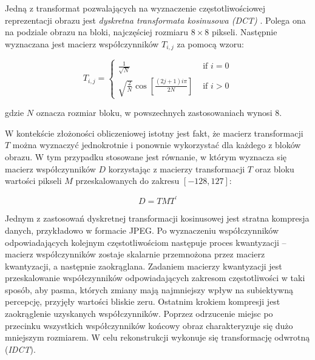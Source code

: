 {{{            %
            Jedną z transformat pozwalających na wyznaczenie częstotliwościowej reprezentacji obrazu jest
            \textit{dyskretna transformata kosinusowa \textnormal{(}DCT\textnormal{)}} \cite{ImageCompressionDCT}.
            Polega ona na podziale obrazu na bloki, najczęściej rozmiaru $8 \times 8$ pikseli. Następnie wyznaczana jest
            macierz współczynników $T_{i, j}$ za pomocą wzoru:

            \begin{equation}\label{eqt:dctcoef}
                T_{i, j}=\left\{\begin{array}{ll}\frac{1}{\sqrt{N}} & \text { if } i=0 \\ \sqrt{\frac{2}{N}} \cos \left[\frac{(2 j+1) i \pi}{2 N}\right] & \text { if } i>0\end{array}\right.
            \end{equation}

            gdzie $N$ oznacza rozmiar bloku, w powszechnych zastosowaniach wynosi 8.

            W kontekście złożoności obliczeniowej istotny jest fakt, że macierz transformacji $T$ można wyznaczyć
            jednokrotnie i ponownie wykorzystać dla każdego z bloków obrazu. W tym przypadku stosowane jest równanie, w
            którym wyznacza się macierz współczynników $D$ korzystając z macierzy transformacji $T$ oraz bloku wartości
            pikseli $M$ przeskalowanych do zakresu $[-128, 127]$:

            \begin{equation}\label{eqt:dctmat}
                D=T M T^{\prime}
            \end{equation}

            Jednym z zastosowań dyskretnej transformacji kosinusowej jest stratna kompresja danych, przykładowo w
            formacie JPEG. Po wyznaczeniu współczynników odpowiadających kolejnym częstotliwościom następuje proces
            kwantyzacji -- macierz współczynników zostaje skalarnie przemnożona przez macierz kwantyzacji, a następnie
            zaokrąglana. Zadaniem macierzy kwantyzacji jest przeskalowanie współczynników odpowiadających zakresom
            częstotliwości w taki sposób, aby pasma, których zmiany mają najmniejszy wpływ na subiektywną percepcję,
            przyjęły wartości bliskie zeru. Ostatnim krokiem kompresji jest zaokrąglenie uzyskanych współczynników.
            Poprzez odrzucenie miejsc po przecinku wszystkich współczynników końcowy obraz charakteryzuje się dużo
            mniejszym rozmiarem. W celu rekonstrukcji wykonuje się transformację odwrotną (\textit{IDCT}).

}}}
